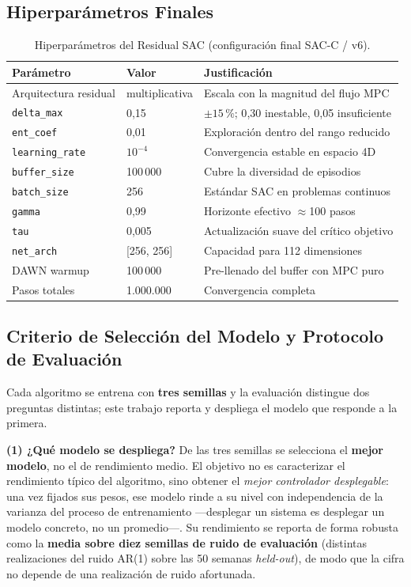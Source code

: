 \documentclass[12pt, a4paper, twoside]{report}
\begin{document}
\subsection{Hiperparámetros Finales}
\label{sub:hiperparams}

\begin{table}[H]
\centering
\caption{Hiperparámetros del Residual SAC (configuración final SAC-C / v6).}
\label{tab:hyperparams}
\begin{tabularx}{\textwidth}{llX}
\toprule
\textbf{Parámetro} & \textbf{Valor} & \textbf{Justificación} \\
\midrule
Arquitectura residual & multiplicativa & Escala con la magnitud del flujo MPC \\
\texttt{delta\_max} & 0{,}15 & $\pm15\,\%$; 0{,}30 inestable, 0{,}05 insuficiente \\
\texttt{ent\_coef} & 0{,}01 & Exploración dentro del rango reducido \\
\texttt{learning\_rate} & $10^{-4}$ & Convergencia estable en espacio 4D \\
\texttt{buffer\_size} & 100\,000 & Cubre la diversidad de episodios \\
\texttt{batch\_size} & 256 & Estándar SAC en problemas continuos \\
\texttt{gamma} & 0{,}99 & Horizonte efectivo $\approx$100 pasos \\
\texttt{tau} & 0{,}005 & Actualización suave del crítico objetivo \\
\texttt{net\_arch} & [256, 256] & Capacidad para 112 dimensiones \\
DAWN warmup & 100\,000 & Pre-llenado del buffer con MPC puro \\
Pasos totales & 1.000.000 & Convergencia completa \\
\bottomrule
\end{tabularx}
\end{table}

\subsection{Criterio de Selección del Modelo y Protocolo de Evaluación}
\label{sub:seleccion}

Cada algoritmo se entrena con \textbf{tres semillas} y la evaluación distingue
dos preguntas distintas; este trabajo reporta y despliega el modelo que responde
a la primera.

\textbf{(1) ¿Qué modelo se despliega?} De las tres semillas se selecciona el
\textbf{mejor modelo}, no el de rendimiento medio. El objetivo no es caracterizar
el rendimiento típico del algoritmo, sino obtener el \emph{mejor controlador
desplegable}: una vez fijados sus pesos, ese modelo rinde a su nivel con
independencia de la varianza del proceso de entrenamiento —desplegar un sistema
es desplegar un modelo concreto, no un promedio—. Su rendimiento se reporta de
forma robusta como la \textbf{media sobre diez semillas de ruido de evaluación}
(distintas realizaciones del ruido AR(1) sobre las 50 semanas \textit{held-out}),
de modo que la cifra no depende de una realización de ruido afortunada.
\end{document}

